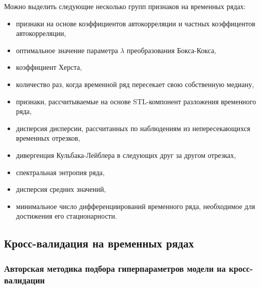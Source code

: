 \documentclass[%
	11pt,
	a4paper,
	utf8,
		]{article}
\begin{document}
Можно выделить следующие несколько групп признаков на временных рядах:
\begin{itemize}
	\item признаки на основе коэффициентов автокорреляции и частных коэффицентов автокорреляции,
	
	\item оптимальное значение параметра $ \lambda $ преобразования Бокса-Кокса,
	
	\item коэффициент Херста,
	
	\item количество раз, когда временной ряд пересекает свою собственную медиану,
	
	\item признаки, рассчитываемые на основе STL-компонент разложения временного ряда,
	
	\item дисперсия дисперсии, рассчитанных по наблюдениям из непересекающихся временных отрезков,
	
	\item дивергенция Кульбака-Лейблера в следующих друг за другом отрезках,
	
	\item спектральная энтропия ряда,
	
	\item дисперсия средних значений,
	
	\item минимальное число дифференциирований временного ряда, необходимое для достижения его стационарности.
\end{itemize}


\subsection{Кросс-валидация на временных рядах}

\subsubsection{Авторская методика подбора гиперпараметров модели на кросс-валидации}
\end{document}
